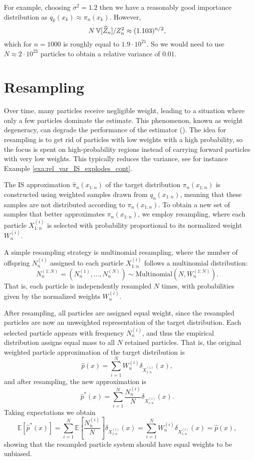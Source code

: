 \begin{example}
	For example, choosing $\sigma^2=1.2$ then we have a reasonably good importance distribution as $q_k(x_k) \approx \pi_n(x_k)$. However,  
	\[
	N\operatorname{\mathbb{V}}[\widehat{Z}_n]/Z_n^2\approx (1.103)^{n/2},
	\]
	which for $n=1000$ is roughly equal to $1.9\cdot 10^{21}$. So we would need to use $N\approx 2\cdot 10^{23}$ particles to obtain a relative variance of $0.01$.
\end{example}

\section{Resampling}
Over time, many particles receive negligible weight, leading to a situation where only a few particles dominate the estimate. This phenomenon, known as weight degeneracy, can degrade the performance of the estimator (\cite{Doucet2000}).
The idea for resampling is to get rid of particles with low weights with a high probability, so the focus is spent on high-probability regions instead of carrying forward particles with very low weights. This typically reduces the variance, see for instance Example \ref{exa:rel_var_IS_explodes_cont}. 

The \gls*{IS} approximation \( \widehat{\pi}_n(x_{1:n}) \) of the target distribution \( \pi_n(x_{1:n}) \) is constructed using weighted samples drawn from \( q_n(x_{1:n}) \), meaning that these samples are not distributed according to \( \pi_n(x_{1:n}) \). To obtain a new set of samples that better approximates \( \pi_n(x_{1:n}) \), we employ resampling, where each particle \( X_{1:n}^{(i)} \) is selected with probability proportional to its normalized weight \( W_n^{(i)} \). 

A simple resampling strategy is multinomial resampling, where the number of offspring \( N_n^{(i)} \) assigned to each particle \( X_{1:n}^{(i)} \) follows a multinomial distribution:
\[
N_n^{(1:N)} = (N_n^{(1)},\dots, N_n^{(N)}) \sim \text{Multinomial}(N, W_n^{(1:N)}).
\]
That is, each particle is independently resampled \( N \) times, with probabilities given by the normalized weights \( W_n^{(i)} \).

After resampling, all particles are assigned equal weight, since the resampled particles are now an unweighted representation of the target distribution. Each selected particle appears with frequency \( N_n^{(i)} \), and thus the empirical distribution assigns equal mass to all \( N \) retained particles. That is, the original weighted particle approximation of the target distribution is  
\[
\hat{p}(x) = \sum_{i=1}^{N} W_n^{(i)} \delta_{X_{1:n}^{(i)}}(x),
\]  
and after resampling, the new approximation is  
\[
\hat{p}^*(x) = \sum_{i=1}^{N} \frac{N_n^{(i)}}{N} \delta_{X_{1:n}^{(i)}}(x).
\]  
Taking expectations we obtain
\[
\mathbb{E} \left[ \hat{p}^*(x) \right] = \sum_{i=1}^{N} \mathbb{E} \left[ \frac{N_n^{(i)}}{N} \right] \delta_{X_{1:n}^{(i)}}(x) = \sum_{i=1}^{N} W_n^{(i)} \delta_{X_{1:n}^{(i)}}(x) = \hat{p}(x),
\]  
showing that the resampled particle system should have equal weights to be unbiased. 

